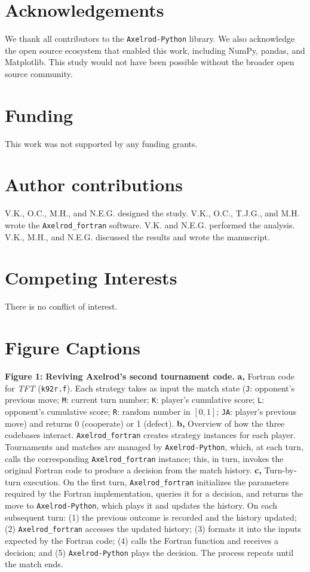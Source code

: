 \documentclass{article}
\newcommand{\TFT}{\emph{TFT}}
\newcommand{\AXL}{\texttt{Axelrod-Python}}
\newcommand{\AXLFortran}{\texttt{Axelrod\_fortran}}
\begin{document}
\section*{Acknowledgements}
We thank all contributors to the \AXL{} library. We also acknowledge the
open source ecosystem that enabled this work, including NumPy, pandas, and
Matplotlib. This study would not have been possible without the broader
open source community.

\section*{Funding}
This work was not supported by any funding grants.

\section*{Author contributions}
V.K., O.C., M.H.,  and N.E.G. designed the study. 
V.K., O.C., T.J.G., and M.H. wrote the \AXLFortran{} software. 
V.K. and N.E.G. performed the analysis.
V.K., M.H., and N.E.G. discussed the results and wrote the manuscript.

\section*{Competing Interests}

There is no conflict of interest.

\newpage





\section*{Figure Captions}

\textbf{Figure 1:} \textbf{Reviving Axelrod's second tournament code.}
\textbf{a,} Fortran code for \TFT{} (\texttt{k92r.f}). Each strategy takes as input the match state
(\texttt{J}: opponent's previous move; \texttt{M}: current turn number; \texttt{K}: player's cumulative score; \texttt{L}: opponent's cumulative score; \texttt{R}: random number in $[0,1]$; \texttt{JA}: player's previous move) and returns 0 (cooperate) or 1 (defect).
\textbf{b,} Overview of how the three codebases interact. \AXLFortran{} creates strategy instances for each
player. Tournaments and matches are managed by \AXL{}, which, at each turn, calls
the corresponding \AXLFortran{} instance; this, in turn, invokes the original
Fortran code to produce a decision from the match history.
\textbf{c,} Turn-by-turn execution. On the first turn, \AXLFortran{} initializes
the parameters required by the Fortran implementation, queries it for a
decision, and returns the move to \AXL{}, which plays it and updates the
history. On each subsequent turn: (1) the previous outcome is recorded and the
history updated; (2) \AXLFortran{} accesses the updated history; (3) formats it
into the inputs expected by the Fortran code; (4) calls the Fortran function and
receives a decision; and (5) \AXL{} plays the decision. The process repeats until
the match ends.\\
\end{document}
